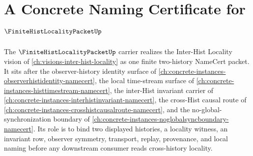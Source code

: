 \chapter{A Concrete Naming Certificate for $\FiniteHistLocalityPacketUp$}
\label{ch:concrete-instances-finite-hist-locality-packet-namecert}

The $\FiniteHistLocalityPacketUp$ carrier realizes the Inter-Hist Locality vision of \autoref{ch:visions-inter-hist-locality} as one finite two-history NameCert packet. It sits after the observer-history identity surface of \autoref{ch:concrete-instances-observerhistidentity-namecert}, the local time-stream surface of \autoref{ch:concrete-instances-histtimestream-namecert}, the inter-Hist invariant carrier of \autoref{ch:concrete-instances-interhistinvariant-namecert}, the cross-Hist causal route of \autoref{ch:concrete-instances-crosshistcausalroute-namecert}, and the no-global-synchronization boundary of \autoref{ch:concrete-instances-noglobalsyncboundary-namecert}. Its role is to bind two displayed histories, a locality witness, an invariant row, observer symmetry, transport, replay, provenance, and local naming before any downstream consumer reads cross-history locality.



